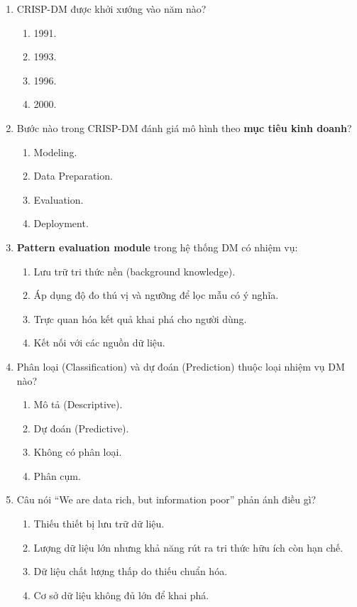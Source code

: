 \documentclass[10pt]{article}
\begin{document}
\begin{enumerate}[leftmargin=*, label=\textbf{Câu \arabic*.}]
    \item CRISP-DM được khởi xướng vào năm nào?
    \begin{enumerate}[label=\Alph*.]
        \item 1991.
        \item 1993.
        \item 1996.
        \item 2000.
    \end{enumerate}

    \item Bước nào trong CRISP-DM đánh giá mô hình theo \textbf{mục tiêu kinh doanh}?
    \begin{enumerate}[label=\Alph*.]
        \item Modeling.
        \item Data Preparation.
        \item Evaluation.
        \item Deployment.
    \end{enumerate}

    \item \textbf{Pattern evaluation module} trong hệ thống DM có nhiệm vụ:
    \begin{enumerate}[label=\Alph*.]
        \item Lưu trữ tri thức nền (background knowledge).
        \item Áp dụng độ đo thú vị và ngưỡng để lọc mẫu có ý nghĩa.
        \item Trực quan hóa kết quả khai phá cho người dùng.
        \item Kết nối với các nguồn dữ liệu.
    \end{enumerate}

    \item Phân loại (Classification) và dự đoán (Prediction) thuộc loại nhiệm vụ DM nào?
    \begin{enumerate}[label=\Alph*.]
        \item Mô tả (Descriptive).
        \item Dự đoán (Predictive).
        \item Không có phân loại.
        \item Phân cụm.
    \end{enumerate}

    \item Câu nói ``We are data rich, but information poor'' phản ánh điều gì?
    \begin{enumerate}[label=\Alph*.]
        \item Thiếu thiết bị lưu trữ dữ liệu.
        \item Lượng dữ liệu lớn nhưng khả năng rút ra tri thức hữu ích còn hạn chế.
        \item Dữ liệu chất lượng thấp do thiếu chuẩn hóa.
        \item Cơ sở dữ liệu không đủ lớn để khai phá.
    \end{enumerate}


\end{enumerate}
\end{document}
